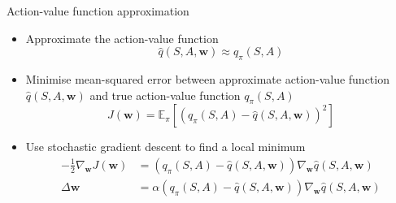 \bgroup
\begin{frame}{Action-value function approximation}
\begin{itemize}
\item Approximate the action-value function
\begin{equation*}
\hat{q}(S,A,\textbf{w})\approx q_{\pi}(S,A)
\end{equation*}
%
\item Minimise mean-squared error between approximate
action-value function $\hat{q}(S,A,\textbf{w})$ and true action-value function $q_{\pi}(S, A)$
\begin{equation*}
J(\textbf{w})=\mathbb{E}_{\pi}[(q_{\pi}(S, A)-\hat{q}(S,A,\textbf{w}))^2]
\end{equation*}
%
\item Use stochastic gradient descent to find a local minimum
\begin{align*}
-\frac{1}{2}\nabla_{\textbf{w}}J(\textbf{w})&=(q_{\pi}(S, A)-\hat{q}(S,A,\textbf{w}))\nabla_{\textbf{w}}\hat{q}(S,A,\textbf{w})\\
\Delta \textbf{w} &= \alpha(q_{\pi}(S, A)-\hat{q}(S,A,\textbf{w}))\nabla_{\textbf{w}}\hat{q}(S,A,\textbf{w})
\end{align*}
%
\end{itemize}
\end{frame}
\egroup